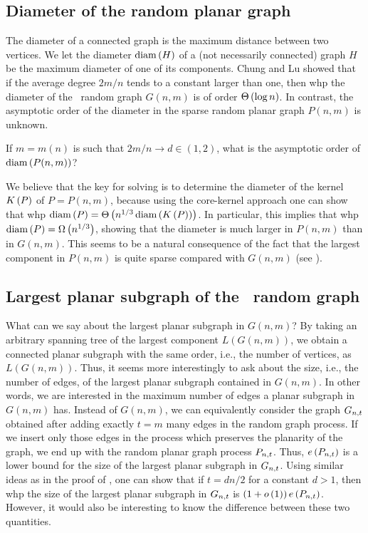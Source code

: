 \subsection{Diameter of the random planar graph}\label{sub:diameter}
The diameter of a connected graph is the maximum distance between two vertices. We let the diameter $\operatorname{diam}\left(H\right)$ of a (not necessarily connected) graph $H$ be the maximum diameter of one of its components. Chung and Lu \cite{ChungLu2001} showed that if the average degree $2m/n$ tends to a constant larger than one, then whp the diameter of the \ER\ random graph $G(n,m)$ is of order $\Theta\left(\log n\right)$. In contrast, the asymptotic order of the diameter in the sparse random planar graph $P(n,m)$ is unknown.

\begin{question}\label{que:diameter}
If $m=m(n)$ is such that $2m/n\to d\in (1,2)$, what is the asymptotic order of $\operatorname{diam}\left(P(n,m)\right)$?
\end{question}

We believe that the key for solving  is to determine the diameter of the kernel $K\left(P\right)$ of $P=P(n,m)$, because using the core-kernel approach one can show that whp $\operatorname{diam}\left(P\right)=\Theta\left(n^{1/3}\operatorname{diam}\left(K\left(P\right)\right)\right)$. In particular, this implies that whp $\operatorname{diam}\left(P\right)=\Omega\left(n^{1/3}\right)$, showing that the diameter is much larger in $P(n,m)$ than in $G(n,m)$. This seems to be a natural consequence of the fact that the largest component in $P(n,m)$ is quite sparse compared with $G(n,m)$ (see ).

\subsection{Largest planar subgraph of the \ER\ random graph}\label{sub:largest_planar_subgraph}
What can we say about the largest planar subgraph in $G(n,m)$? By taking an arbitrary spanning tree of the largest component $L(G(n,m))$, we obtain a connected planar subgraph with the same order, i.e., the number of vertices, as $L(G(n,m))$. Thus, it seems more interestingly to ask about the size, i.e., the number of edges, of the largest planar subgraph contained in $G(n,m)$. In other words, we are interested in the maximum number of edges a planar subgraph in $G(n,m)$ has. Instead of $G(n,m)$, we can equivalently consider the graph $G_{n,t}$ obtained after adding exactly $t=m$ many edges in the random graph process. If we insert only those edges in the process which preserves the planarity of the graph, we end up with the random planar graph process $P_{n,t}$. Thus, $e\left({P_{n,t}}\right)$ is a lower bound for the size of the largest planar subgraph in $G_{n,t}$. Using similar ideas as in the proof of , one can show that if $t=dn/2$ for a constant $d>1$, then whp the size of the largest planar subgraph in $G_{n,t}$ is $\left(1+o\left(1\right)\right)e\left({P_{n,t}}\right)$. However, it would also be interesting to know the difference between these two quantities.

